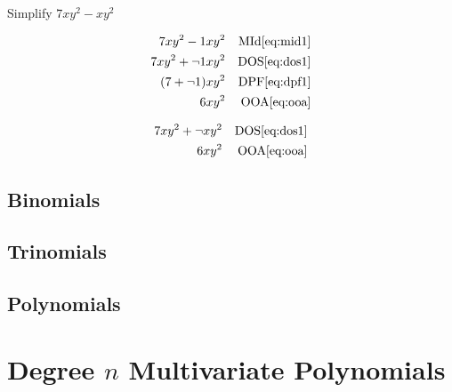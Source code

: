 \begin{example}[id:20141106-151409] \label{20141106-151409}  \hfill \\

Simplify $7xy^2-xy^2$

\soln

\solnsteps
\begin{align*}
7xy^2-1xy^2 && \text{MId} \eqref{eq:mid1} \\
7xy^2+\neg 1xy^2 && \text{DOS} \eqref{eq:dos1} \\
(7+\neg 1)xy^2 && \text{DPF} \eqref{eq:dpf1} \\
6xy^2 && \text{OOA} \eqref{eq:ooa} 
\end{align*}

\soln

\lesssteps
\begin{align*}
7xy^2 + \neg xy^2 && \text{DOS} \eqref{eq:dos1} \\
6xy^2 && \text{OOA} \eqref{eq:ooa} 
\end{align*}

\end{example}

\subsection*{Binomials}

\subsection*{Trinomials}

\subsection*{Polynomials}

\section*{Degree $n$ Multivariate Polynomials}

